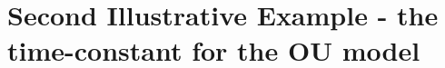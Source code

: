 \documentclass{article}
\begin{document}
% 
% 
% 
% 
% 
% 
% 
% 


\section{Second Illustrative Example - the time-constant for the OU model}
\end{document}
